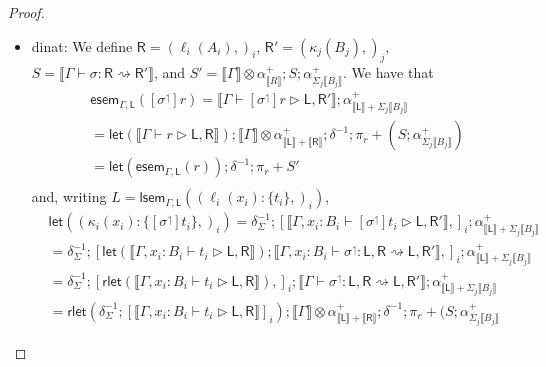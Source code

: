 \documentclass[acmsmall,screen,review]{acmart}
\newcommand{\ms}[1]{\ensuremath{\mathsf{#1}}}
\newcommand{\lto}{:}
\newcommand{\wbranch}[3]{#1(#2) \lto \{#3\}}
\newcommand{\lupg}[1]{{#1}^\upharpoonleft}
\newcommand{\bhyp}[2]{#1 : #2}
\newcommand{\haslb}[3]{#1 \vdash #2 \rhd #3}
\newcommand{\lbsubst}[4]{#1 \vdash #2: #3 \rightsquigarrow #4}
\newcommand{\brle}[1]{{\textsf{#1}}}
\newcommand{\dnt}[1]{\llbracket{#1}\rrbracket}
\newcommand{\entrymor}[3]{\ms{esem}_{#1, #3}(#2)}
\newcommand{\loopmor}[3]{\ms{lsem}_{#1, #3}(#2)}
\newcommand{\lmor}[1]{\ms{let}(#1)}
\newcommand{\rlmor}[1]{\ms{rlet}(#1)}
\begin{document}
\begin{proof}
\begin{itemize}[leftmargin=*]
    \item \brle{dinat}: 
    We define 
      $\ms{R} = (\ell_i(A_i),)_i$, $\ms{R}' = (\kappa_j(B_j),)_j$, %
      $S = \dnt{\lbsubst{\Gamma}{\sigma}{\ms{R}}{\ms{R}'}}$, and %
      $S' = \dnt{\Gamma} \otimes \alpha^+_{\dnt{R}} ; S ; \alpha^+_{\Sigma_j\dnt{B_j}}$. %
    We have that
    \begin{equation}
      \begin{aligned}
        & \entrymor{\Gamma}{[\lupg{\sigma}]r}{\ms{L}}
          = \dnt{\haslb{\Gamma}{[\lupg{\sigma}]r}{\ms{L}, \ms{R}'}}
          ; \alpha^+_{\dnt{\ms{L}} + \Sigma_j \dnt{B_j}} \\
        & = \lmor{\dnt{\haslb{\Gamma}{r}{\ms{L}, \ms{R}}}}
          ; \dnt{\Gamma} \otimes \alpha^+_{\dnt{\ms{L}} + \dnt{\ms{R}}}
          ; \delta^{-1}
          ; \pi_r 
            + (S ; \alpha^+_{\Sigma_j\dnt{B_j}}) \\
        & = \lmor{\entrymor{\Gamma}{r}{\ms{L}}} ; \delta^{-1} ; \pi_r + S' \\
      \end{aligned}
    \end{equation}
    and, writing $L = \loopmor{\Gamma}{(\wbranch{\ell_i}{x_i}{t_i},)_i}{\ms{L}}$,
    \begin{equation}
      \begin{aligned}
        & \lmor{(\wbranch{\kappa_i}{x_i}{[\lupg{\sigma}]t_i},)_i}
          = \delta^{-1}_\Sigma
          ; [ \dnt{\haslb{\Gamma, \bhyp{x_i}{B_i}}{[\lupg{\sigma}]t_i}{\ms{L}, \ms{R}'}}, ]_i
          ; \alpha^+_{\dnt{\ms{L}} + \Sigma_j \dnt{B_j}} \\
        & = \delta^{-1}_\Sigma
          ; [ \lmor{\dnt{\haslb{\Gamma, \bhyp{x_i}{B_i}}{t_i}{\ms{L}, \ms{R}}}} 
            ; \dnt{\lbsubst{\Gamma, \bhyp{x_i}{B_i}}
                    {\lupg{\sigma}}{\ms{L}, \ms{R}}{\ms{L}, \ms{R}'}},
          ]_i
          ; \alpha^+_{\dnt{\ms{L}} + \Sigma_j \dnt{B_j}} \\
        & = \delta^{-1}_\Sigma
          ; [ \rlmor{\dnt{\haslb{\Gamma, \bhyp{x_i}{B_i}}{t_i}{\ms{L}, \ms{R}}}},
          ]_i
          ; \dnt{\lbsubst{\Gamma}{\lupg{\sigma}}{\ms{L}, \ms{R}}{\ms{L}, \ms{R}'}}
          ; \alpha^+_{\dnt{\ms{L}} + \Sigma_j \dnt{B_j}} \\
        & = \rlmor{\delta^{-1}_\Sigma
          ; [ \dnt{\haslb{\Gamma, \bhyp{x_i}{B_i}}{t_i}{\ms{L}, \ms{R}}}
          ]_i}
          ; \dnt{\Gamma} \otimes \alpha^+_{\dnt{\ms{L}} + \dnt{\ms{R}}}
          ; \delta^{-1}
          ; \pi_r + (
            S ; \alpha^+_{\Sigma_j\dnt{B_j}}

\end{aligned}
\end{equation}
\end{itemize}
\end{proof}
\end{document}
